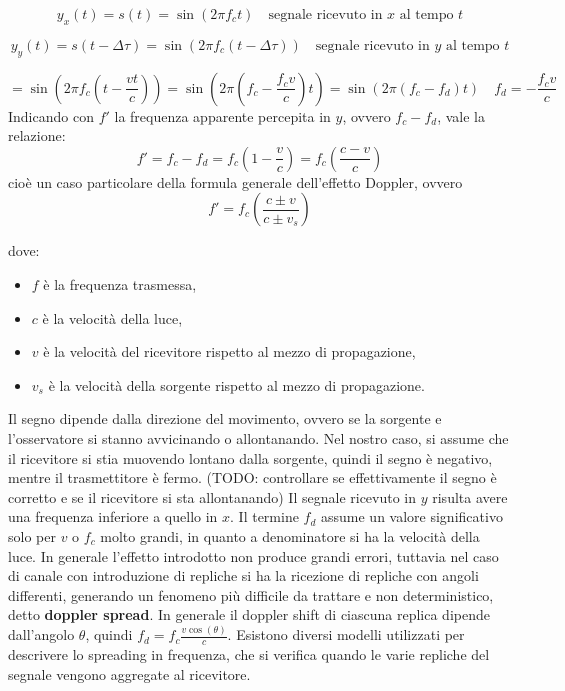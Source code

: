\[
    y_x(t) = s(t) = \sin(2\pi f_c t) \quad \text{segnale ricevuto in $x$ al tempo $t$}
\]

\[
    y_y(t) = s(t-\Delta \tau) = \sin(2\pi f_c (t-\Delta \tau)) \quad \text{segnale ricevuto in $y$ al tempo $t$}
\]

\[
    = \sin\left(2\pi f_c \left(t - \frac{vt}{c}\right)\right) = \sin\left(2\pi \left(f_c - \frac{f_c v}{c}\right) t\right) = \sin\left(2\pi \left(f_c - f_d \right) t \right) \quad \boxed{f_d = -\frac{f_c v}{c}}
\]
Indicando con $f'$ la frequenza apparente percepita in $y$, ovvero $f_c - f_d$, vale la relazione:
\[
    f' = f_c - f_d = f_c \left(1 - \frac{v}{c}\right) = f_c \left( \frac{c - v}{c} \right)
\]
cioè un caso particolare della formula generale dell'effetto Doppler, ovvero
\[
    f' = f_c \left( \frac{c \pm v}{c \pm v_s} \right)
\]

dove:
\begin{itemize}
    \item $f$ è la frequenza trasmessa,
    \item $c$ è la velocità della luce,
    \item $v$ è la velocità del ricevitore rispetto al mezzo di propagazione,
    \item $v_s$ è la velocità della sorgente rispetto al mezzo di propagazione.
\end{itemize}


Il segno dipende dalla direzione del movimento, ovvero se la sorgente e l'osservatore si stanno avvicinando o allontanando. Nel nostro caso, si assume che il ricevitore si stia muovendo lontano dalla sorgente, quindi il segno è negativo, mentre il trasmettitore è fermo.
(TODO: controllare se effettivamente il segno è corretto e se il ricevitore si sta allontanando)
Il segnale ricevuto in $y$ risulta avere una frequenza inferiore a quello in $x$. Il termine $f_d$ assume un valore significativo solo per $v$ o $f_c$ molto grandi, in quanto a denominatore si ha la velocità della luce. In generale l'effetto introdotto non produce grandi errori, tuttavia nel caso di canale con introduzione di repliche si ha la ricezione di repliche con angoli differenti, generando un fenomeno più difficile da trattare e non deterministico, detto \textbf{doppler spread}.
In generale il doppler shift di ciascuna replica dipende dall'angolo $\theta$, quindi $f_d = f_c \frac{v \cos(\theta)}{c}$.
Esistono diversi modelli utilizzati per descrivere lo spreading in frequenza, 
che si verifica quando le varie repliche del segnale vengono aggregate al ricevitore.

